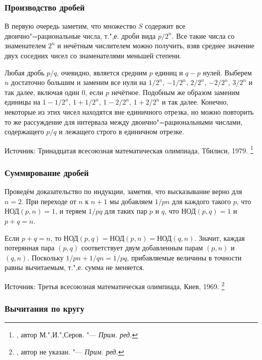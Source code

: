 \documentclass[twoside]{book}
\begin{document}
\subsubsection*{Производство дробей}%

В первую очередь заметим, что множество $S$ содержит все двоично"=рациональные числа, 
т.",е. дроби вида $p/2^n$.
Все такие числа со знаменателем $2^n$ и нечётным числителем можно получить, взяв среднее значение двух соседних чисел со знаменателями меньшей степени.

Любая дробь $p/q$, очевидно, является средним $p$ единиц и $q-p$ нулей.
Выберем $n$ достаточно большим и заменим все нули на $1/2^n$, $-1/2^n$, $2/2^n$, $-2/2^n$, $3/2^n$ и так далее, включая один $0$, если $p$ нечётное.
Подобным же образом заменим единицы на $1-1/2^n$, $1+1/2^n$, $1-2/2^n$, $1+2/2^n$ и так далее.
Конечно, некоторые из этих чисел находятся вне единичного отрезка, но можно повторить то же рассуждение для интервала между двоично"=рациональными числами, содержащего $p/q$ и лежащего строго в единичном отрезке.%
\heart

\medskip
{\small 
Источник: Тринадцатая всесоюзная математическая олимпиада, Тбилиси, 1979.%
\footnote{\cite[№272]{ВсМО}, автор  М.",И.",Серов. "--- \emph{Прим. ред.}}

}
\subsubsection*{Суммирование дробей}%

Проведём доказательство по индукции, заметив, что высказывание верно для $n=2$.
При переходе от $n$ к $n+1$ мы добавляем $1/pn$ для каждого такого $p$, что $\text{НОД}(p,n)=1$, и теряем $1/pq$ для таких пар $p$ и $q$, что $\text{НОД}(p,q)=1$ и $p+q=n$.

Если $p+q=n$, то
$\text{НОД}(p,q)=\text{НОД}(p,n)=\text{НОД}(q,n)$.
Значит, каждая потерянная пара $(p,q)$ соответствует двум добавленным парам $(p,n)$ и $(q,n)$.
Поскольку $1/pn+1/qn=1/pq$, прибавляемые величины в точности равны вычитаемым, т.",е. сумма не меняется.
\heart

\medskip
{\small 
Источник: Третья всесоюзная математическая олимпиада, Киев, 1969.%
\footnote{\cite[№120]{ВсМО}, автор не указан. "--- \emph{Прим. ред.}}

}
\subsubsection*{Вычитания по кругу}%
\end{document}
